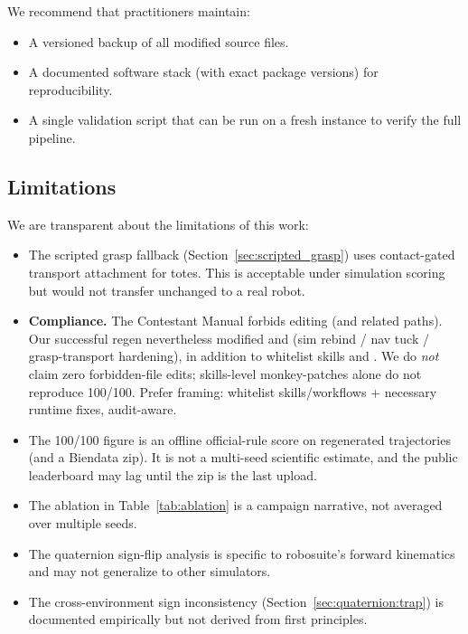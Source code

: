 We recommend that practitioners maintain:
\begin{itemize}[leftmargin=*,itemsep=2pt]
    \item A versioned backup of all modified source files.
    \item A documented software stack (with exact package versions) for reproducibility.
    \item A single validation script that can be run on a fresh instance to verify the full pipeline.
\end{itemize}

\subsection{Limitations}
\label{sec:discussion:limitations}

We are transparent about the limitations of this work:
\begin{itemize}[leftmargin=*,itemsep=2pt]
    \item The scripted grasp fallback (Section~\ref{sec:scripted_grasp}) uses contact-gated transport attachment for totes. This is acceptable under simulation scoring but would not transfer unchanged to a real robot.
    \item \textbf{Compliance.} The Contestant Manual forbids editing  (and related paths). Our successful regen nevertheless modified  and  (sim rebind / nav tuck / grasp-transport hardening), in addition to whitelist skills and . We do \emph{not} claim zero forbidden-file edits; skills-level monkey-patches alone do not reproduce 100/100. Prefer framing: whitelist skills/workflows + necessary runtime fixes, audit-aware.
    \item The 100/100 figure is an offline official-rule score on regenerated trajectories (and a Biendata zip). It is not a multi-seed scientific estimate, and the public leaderboard may lag until the zip is the last upload.
    \item The ablation in Table~\ref{tab:ablation} is a campaign narrative, not averaged over multiple seeds.
    \item The quaternion sign-flip analysis is specific to robosuite's forward kinematics and may not generalize to other simulators.
    \item The cross-environment sign inconsistency (Section~\ref{sec:quaternion:trap}) is documented empirically but not derived from first principles.
\end{itemize}

